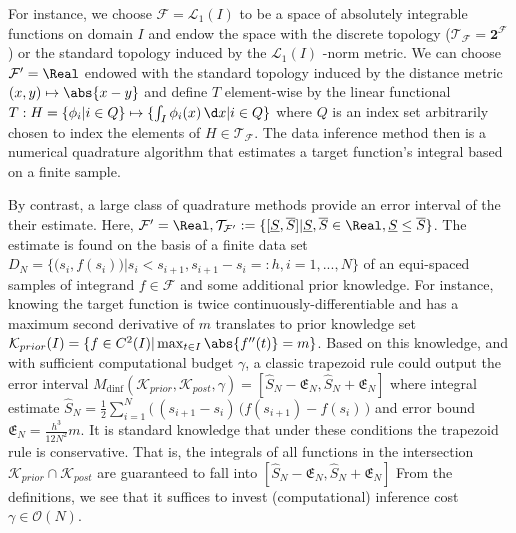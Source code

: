 \begin{ex} [Quadrature] \label{ex:topinf_quad} For instance, we choose $\mathcal F = \mathcal L_1(I)$ to be a space of absolutely integrable functions on domain $I$ and endow the space with the discrete topology ($\mathcal T_{\mathcal F}= \textbf{2}^{\mathcal F} $) or the standard topology induced by the $\mathcal L_1(I)$ -norm metric. 
We can choose $\mathcal F' = \Real$ endowed with the standard topology induced by the distance metric $(x,y) \mapsto \abs{x-y}$ and define $T$ element-wise by the linear functional \cite{wernerfunkana} $T: H=\{\phi_i | i\in Q \} \mapsto \{ \int_I \phi_i(x) \, \d x | i \in Q \}$ where $Q$ is an index set arbitrarily chosen to index the elements of $H \in \mathcal T_{\mathcal F}$. 
The data inference method then is a numerical quadrature algorithm that estimates a target function's integral based on a finite sample. 

By contrast, a large class of quadrature methods provide an error interval of the their estimate. Here, $\mathcal F' = \Real, \mathcal T_{\mathcal F'} := \{ [\underline S, \overline S] | \underline S, \overline S \in \Real, \underline S\leq \overline S \}$. The estimate is found on the basis of a finite data set $D_N= \{ \bigl(s_i,f(s_i)\bigr) | s_i < s_{i+1}, s_{i+1}-s_{i} =: h, i=1,...,N \}$ of an equi-spaced samples of integrand $f \in \mathcal F$ and some additional prior knowledge.
For instance, knowing the target function is twice continuously-differentiable and has a maximum second derivative of $m$ translates to prior knowledge set 
$\mathcal K_{prior}(I) = \{f \in C^2(I) |\max_{t \in I} \abs{  f'' (t)} =m  \}$. Based on this knowledge, and with sufficient computational budget $\gamma$, a classic trapezoid rule 
 could output the error interval $M_{\text{dinf}}(\mathcal K_{prior},\mathcal K_{post}, \gamma) = [\hat S_N- \mathfrak E_N, \hat S_N + \mathfrak E_N]$ where integral estimate $\hat S_N = \frac{1}{2} \sum_{i=1}^N \bigl(\,(s_{i+1} - s_i) \,(f(s_{i+1}) - f(s_i)\, \bigr) $ and error bound $\mathfrak E_N = \frac{h^3}{12 N^2} m$.
 It is standard knowledge that under these conditions the trapezoid rule is conservative. That is, the integrals of all functions in the intersection $\mathcal K_{prior}\cap \mathcal K_{post}$ are guaranteed to fall into $[\hat S_N- \mathfrak E_N, \hat S_N + \mathfrak E_N]$ From the definitions, we see that it suffices to invest (computational) inference cost $ \gamma \in \mathcal O(N)$.
\end{ex}